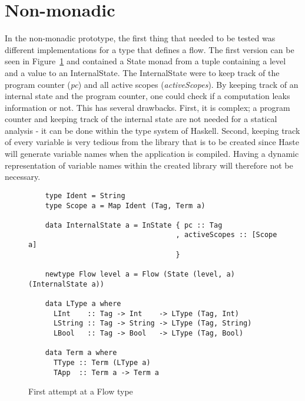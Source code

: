 \section{Non-monadic}
In the non-monadic prototype, the first thing that needed to be tested was different implementations for a type that defines a flow. The first version can be seen in Figure~\ref{fig:first_flow} and contained a State monad from a tuple containing a level and a value to an InternalState. The InternalState were to keep track of the program counter (\emph{pc}) and all active scopes (\emph{activeScopes}). By keeping track of an internal state and the program counter, one could check if a computation leaks information or not. This has several drawbacks. First, it is complex; a program counter and keeping track of the internal state are not needed for a statical analysis - it can be done within the type system of Haskell. Second, keeping track of every variable is very tedious from the library that is to be created since Haste will generate variable names when the application is compiled. Having a dynamic representation of variable names within the created library will therefore not be necessary.
\begin{figure}[h]
  \lstset{language=Haskell}
  \begin{lstlisting}
    type Ident = String
    type Scope a = Map Ident (Tag, Term a)
    
    data InternalState a = InState { pc :: Tag
                                   , activeScopes :: [Scope a]
                                   }

    newtype Flow level a = Flow (State (level, a) (InternalState a))

    data LType a where
      LInt    :: Tag -> Int    -> LType (Tag, Int)
      LString :: Tag -> String -> LType (Tag, String)
      LBool   :: Tag -> Bool   -> LType (Tag, Bool)

    data Term a where
      TType :: Term (LType a)
      TApp  :: Term a -> Term a

  \end{lstlisting}
  \caption{First attempt at a Flow type}
  \label{fig:first_flow}
\end{figure}

